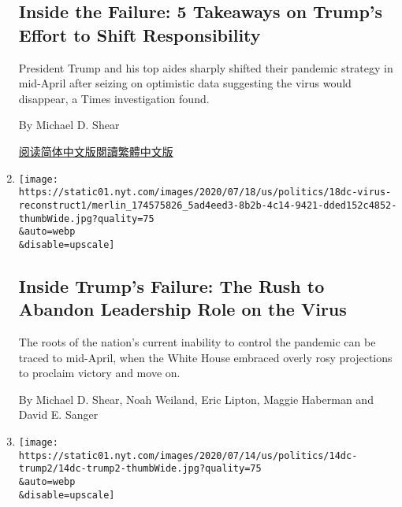 \begin{enumerate}
  \hypertarget{inside-the-failure-5-takeaways-on-trumps-effort-to-shift-responsibility}{%
  \subsection{Inside the Failure: 5 Takeaways on Trump's Effort to Shift
  Responsibility}\label{inside-the-failure-5-takeaways-on-trumps-effort-to-shift-responsibility}}

  President Trump and his top aides sharply shifted their pandemic
  strategy in mid-April after seizing on optimistic data suggesting the
  virus would disappear, a Times investigation found.

  By Michael D. Shear

  \href{https://cn.nytimes.com/usa/20200720/trump-coronavirus-failure-takeaways/}{阅读简体中文版}\href{https://cn.nytimes.com/usa/20200720/trump-coronavirus-failure-takeaways/zh-hant/}{閱讀繁體中文版}
\item
  \href{/2020/07/18/us/politics/trump-coronavirus-response-failure-leadership.html}{}

  \texttt{[image: https://static01.nyt.com/images/2020/07/18/us/politics/18dc-virus-reconstruct1/merlin\_174575826\_5ad4eed3-8b2b-4c14-9421-dded152c4852-thumbWide.jpg?quality=75\\\&auto=webp\\\&disable=upscale]}

  \hypertarget{inside-trumps-failure-the-rush-to-abandon-leadership-role-on-the-virus}{%
  \subsection{Inside Trump's Failure: The Rush to Abandon Leadership
  Role on the
  Virus}\label{inside-trumps-failure-the-rush-to-abandon-leadership-role-on-the-virus}}

  The roots of the nation's current inability to control the pandemic
  can be traced to mid-April, when the White House embraced overly rosy
  projections to proclaim victory and move on.

  By Michael D. Shear, Noah Weiland, Eric Lipton, Maggie Haberman and
  David E. Sanger
\item
  \href{/2020/07/14/us/politics/trump-news-conference.html}{}

  \texttt{[image: https://static01.nyt.com/images/2020/07/14/us/politics/14dc-trump2/14dc-trump2-thumbWide.jpg?quality=75\\\&auto=webp\\\&disable=upscale]}

  \hypertarget{the-white-house-called-a-news-conference-trump-turned-it-into-a-meandering-monologue}{%
}
\end{enumerate}
